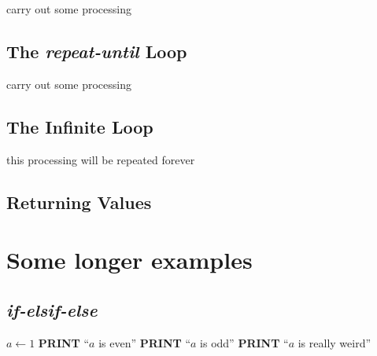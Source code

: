 \documentclass{amsart}
\begin{document}
\begin{algorithmic}[1]
        \State carry out some processing 
    \EndWhile
\end{algorithmic}

\subsection{The \emph{repeat-until} Loop}

\begin{algorithmic}[1]
    \Repeat{}
        \State carry out some processing 
\end{algorithmic}

\subsection{The Infinite Loop}

\begin{algorithmic}[1]
    \Loop{}
        \State this processing will be repeated forever
    \EndLoop
\end{algorithmic}

\subsection{Returning Values}


% 

\section{Some longer examples}

\subsection{\emph{if-elsif-else}}

\begin{algorithmic}[3]
    \State $a \leftarrow 1$
        \State \textbf{PRINT} ``$a$ is even''
        \State \textbf{PRINT} ``$a$ is odd''
    \Else
        \State \textbf{PRINT} ``$a$ is really weird''
    \EndIf
\end{algorithmic}
\end{document}
